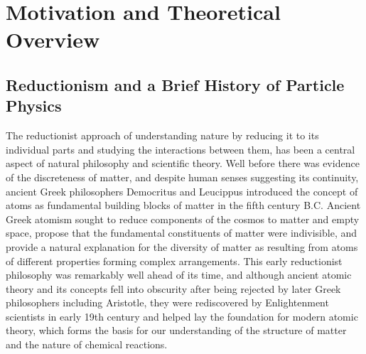 
\chapter{Motivation and Theoretical Overview}


\section{Reductionism and a Brief History of Particle Physics}
The reductionist approach of understanding nature by reducing it to its individual parts and studying the interactions between them, has been a central aspect of natural philosophy and scientific theory.
Well before there was evidence of the discreteness of matter, and despite human senses suggesting its continuity, ancient Greek philosophers Democritus and Leucippus introduced the concept of atoms as fundamental building blocks of matter in the fifth century B.C.
Ancient Greek atomism sought to reduce components of the cosmos to matter and empty space, propose that the fundamental constituents of matter were indivisible, and provide a natural explanation for the diversity of matter as resulting from atoms of different properties forming complex arrangements.
This early reductionist philosophy was remarkably well ahead of its time, and although ancient atomic theory and its concepts fell into obscurity after being rejected by later Greek philosophers including Aristotle, they were rediscovered by Enlightenment scientists in early 19th century and helped lay the foundation for modern atomic theory, which forms the basis for our understanding of the structure of matter and the nature of chemical reactions.

